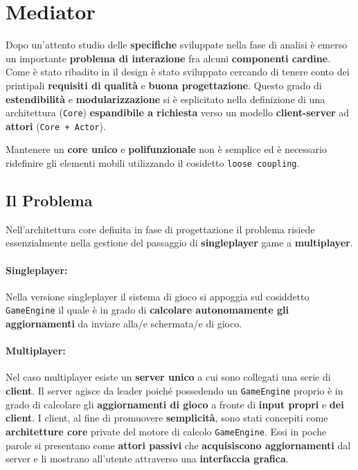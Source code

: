 \section{Mediator}
\label{sec:mediator_design}

Dopo un'attento studio delle \textbf{specifiche} sviluppate nella fase di analisi è emerso un importante \textbf{problema di interazione} fra alcuni \textbf{componenti cardine}. Come è stato ribadito in il design è stato sviluppato cercando di tenere conto dei printipali \textbf{requisiti di qualità} e \textbf{buona progettazione}. Questo grado di \textbf{estendibilità} e \textbf{modularizzazione} si è esplicitato nella definizione di una architettura (\texttt{Core}) \textbf{espandibile a richiesta} verso un modello \textbf{client-server} ad \textbf{attori} (\texttt{Core + Actor}).

Mantenere un \textbf{core unico} e \textbf{polifunzionale} non è semplice ed è necessario ridefinire gli elementi mobili utilizzando il cosidetto \texttt{loose coupling}. 

\subsection{Il Problema}
Nell'architettura core definita in fase di progettazione il problema risiede essenzialmente nella gestione del passaggio di \textbf{singleplayer} game a \textbf{multiplayer}. 

\paragraph{Singleplayer:}
Nella versione singleplayer il sistema di gioco si appoggia sul cosiddetto \texttt{GameEngine} il quale è in grado di \textbf{calcolare autonomamente gli aggiornamenti} da inviare alla/e schermata/e di gioco.

\paragraph{Multiplayer:}
Nel caso multiplayer esiste un \textbf{server unico} a cui sono collegati una serie di \textbf{client}. Il server agisce da leader poiché possedendo un \texttt{GameEngine} proprio è in grado di calcolare gli \textbf{aggiornamenti di gioco} a fronte di \textbf{input propri} e \textbf{dei client}. I client, al fine di promuovere \textbf{semplicità}, sono stati concepiti come \textbf{architetture core} private del motore di calcolo \texttt{GameEngine}. Essi in poche parole si presentano come \textbf{attori passivi} che \textbf{acquisiscono aggiornamenti} dal server e li mostrano all'utente attraverso una \textbf{interfaccia grafica}.

